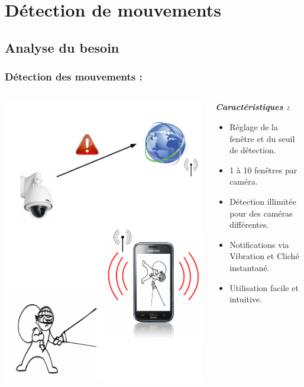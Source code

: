 
\section{Détection de mouvements}
 \subsection{Analyse du besoin}
  \begin{frame}
   \frametitle{Détection des mouvements :}



\begin{columns}
\begin{column}{5cm}

   \includegraphics[scale=0.25]{Images/ImageSlide10.pdf}
\end{column}
\begin{column}{7cm}
\textbf{\textit{Caractéristiques :}} 
\begin{itemize}
    \item Réglage de la fenêtre et du seuil de détection.
  	\item 1 à 10 fenêtres par caméra.
  	\item Détection illimitée pour des caméras différentes.
 	\item Notifications via Vibration et Cliché instantané.
 	\item Utilisation facile et intuitive.
\end{itemize}
\end{column}
\end{columns}
  \end{frame}
